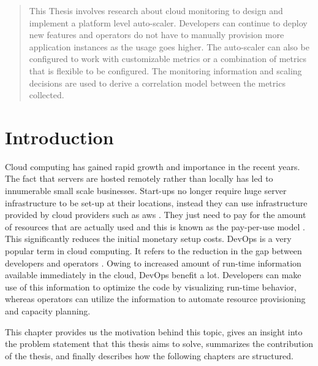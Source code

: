 \documentclass[article,type=msc,colorback,12pt,accentcolor=tud8b,table]{tudthesis}
\begin{document}
\begin{abstract}
	This Thesis involves research about cloud monitoring to design and implement a platform level auto-scaler. Developers can continue to deploy new features and operators do not have to manually provision more application instances as the usage goes higher. The auto-scaler can also be configured to work with customizable metrics or a combination of metrics that is flexible to be configured. The monitoring information and scaling decisions are used to derive a correlation model between the metrics collected.
	

\end{abstract}  

\clearpage

\setlength{ \parskip }{1em}
\tableofcontents 
\cleardoublepage 
\listoffigures
\cleardoublepage 
\listoftables
\clearpage
\cleardoublepage 


\hfill
 \section{Introduction}
	 \hfill \break
	
		Cloud computing has gained rapid growth and importance in the recent years. The fact that servers are hosted remotely rather than locally has led to innumerable small scale businesses. Start-ups no longer require huge server infrastructure to be set-up at their locations, instead they can use infrastructure provided by cloud providers such as \gls{aws} \cite{aws}. They just need to pay for the amount of resources that are actually used and this is known as the pay-per-use model \cite{armbrust2010view}. This significantly reduces the initial monetary setup costs. DevOps is a very popular term in cloud computing. It refers to the reduction in the gap between developers and operators \cite{httermann2012devops}. Owing to increased amount of run-time information available immediately in the cloud, DevOps benefit a lot. Developers can make use of this information to optimize the code by visualizing run-time behavior, whereas operators can utilize the information to automate resource provisioning and capacity planning.
		
		
		\par This chapter provides us the motivation behind this topic, gives an insight into the problem statement that this thesis aims to solve, summarizes the contribution of the thesis, and finally describes how the following chapters are structured.
	
\end{document}
